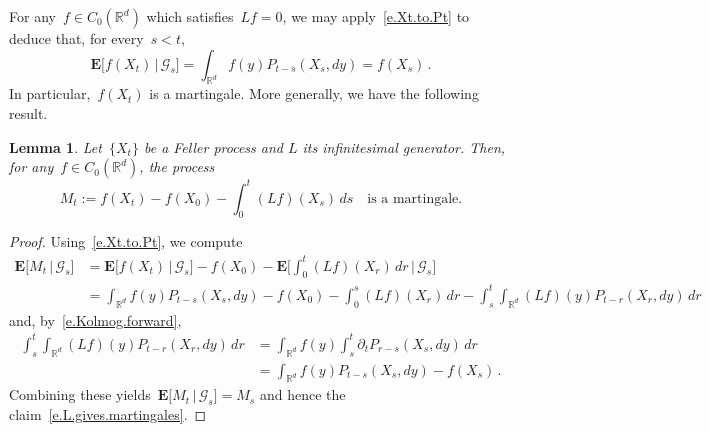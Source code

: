 \documentclass[11pt]{article} %
\numberwithin{equation}{section}
\newtheorem{lemma}[theorem]{Lemma}
\theoremstyle{definition}
\newcommand*{\Rd}{\ensuremath{\mathbb{R}^d}}
\begin{document}
\smallskip

For any~$f \in C_0(\Rd)$ which satisfies~$L f = 0$, we may apply~\eqref{e.Xt.to.Pt} to deduce that, for every~$s<t$, 
\begin{equation}
\mathbf{E}\bigl[ f(X_t) \,|\, \mathcal{G}_s \bigr] 
=
\int_{\Rd} 
f(y) P_{t-s} (X_s,dy) 
=
f(X_s)\,.
\end{equation}
In particular,~$f(X_t)$ is a martingale. 
More generally, we have the following result.

\begin{lemma}
Let~$\{X_t\}$ be a Feller process and $L$ its infinitesimal generator. Then, for any~$f\in C_0(\Rd)$, the process
\begin{equation}
\label{e.L.gives.martingales}
M_t := f(X_t) - f(X_0) - \int_0^t (Lf)(X_s)\,ds
\quad \mbox{is a martingale.}
\end{equation}
\end{lemma}
\begin{proof}
Using~\eqref{e.Xt.to.Pt}, we compute
\begin{align*}
\mathbf{E} \bigl[ M_t \, \vert\, \mathcal{G}_s \bigr] 
&
=
\mathbf{E}\bigl[ f(X_t) \,|\, \mathcal{G}_s \bigr] 
- f(X_0) 
-
\mathbf{E}\biggl[ 
\int_0^t
(Lf)(X_r)\,dr
\,\Big\vert\, \mathcal{G}_s
\biggr]
\\ & 
= 
\! \int_{\Rd} \!
f(y) P_{t-s} (X_s,dy) 
- f(X_0)
-
\! \int_0^s (Lf)(X_r)\,dr
-
\int_s^t \!
\int_{\Rd} 
(Lf)(y) P_{t-r}(X_r,dy)
\,dr
\end{align*}
and, by~\eqref{e.Kolmog.forward}, 
\begin{align*}
\int_s^t 
\int_{\Rd} 
(Lf)(y) P_{t-r}(X_r,dy)
\,dr
&
=
\int_{\Rd} 
f(y) 
\int_s^t 
\partial_t P_{r-s}(X_s,dy)
\,dr
\\ & 
=
\int_{\Rd} 
f(y) P_{t-s}(X_s,dy)
-
f(X_s)\,.
\end{align*}
Combining these yields~$\mathbf{E} \bigl[ M_t \, \vert\, \mathcal{G}_s \bigr] = M_s$ and hence the claim~\eqref{e.L.gives.martingales}. 
\end{proof}
\end{document}
